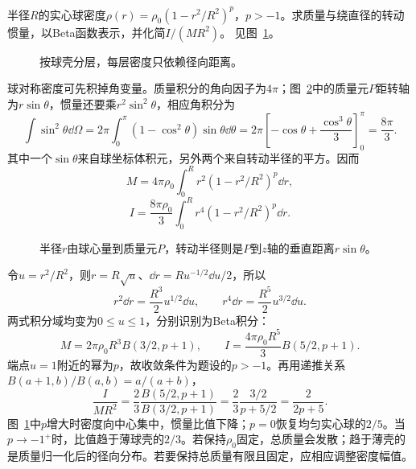 \begin{exercise}[从非均匀球体的转动惯量积分到Beta函数]\label{ex:c4-h16}
半径$R$的实心球密度$\rho(r)=\rho_0(1-r^2/R^2)^p$，$p>-1$。求质量与绕直径的转动惯量，以Beta函数表示，并化简$I/(MR^2)$。 见图~\ref{fig:c4-h16-q}。
\end{exercise}

\begin{figure}[H]\centering
{}
\caption{按球壳分层，每层密度只依赖径向距离。}\label{fig:c4-h16-q}
\end{figure}
\begin{solution}
球对称密度可先积掉角变量。质量积分的角向因子为$4\pi$；图~\ref{fig:c4-h16-s}中的质量元$P$距转轴为$r\sin\theta$，惯量还要乘$r^2\sin^2\theta$，相应角积分为
\[\int\sin^2\theta\dd\Omega
=2\pi\int_0^\pi(1-\cos^2\theta)\sin\theta\dd\theta
=2\pi\left[-\cos\theta+\frac{\cos^3\theta}{3}\right]_0^\pi
=\frac{8\pi}3.\]
其中一个$\sin\theta$来自球坐标体积元，另外两个来自转动半径的平方。因而
\[M=4\pi\rho_0\int_0^Rr^2(1-r^2/R^2)^p\dd r,\]
\[I=\frac{8\pi\rho_0}3\int_0^Rr^4(1-r^2/R^2)^p\dd r.\]
\begin{figure}[H]\centering
{}
\caption{半径$r$由球心量到质量元$P$，转动半径则是$P$到$z$轴的垂直距离$r\sin\theta$。}\label{fig:c4-h16-s}
\end{figure}

令$u=r^2/R^2$，则$r=R\sqrt u$、$\dd r=R u^{-1/2}\dd u/2$，所以
\[r^2\dd r=\frac{R^3}2u^{1/2}\dd u,\qquad
r^4\dd r=\frac{R^5}2u^{3/2}\dd u.\]
两式积分域均变为$0\le u\le1$，分别识别为Beta积分：
\[\boxed{M=2\pi\rho_0R^3B(3/2,p+1)},\qquad
I=\frac{4\pi\rho_0R^5}3B(5/2,p+1).\]
端点$u=1$附近的幂为$p$，故收敛条件为题设的$p>-1$。再用递推关系$B(a+1,b)/B(a,b)=a/(a+b)$，
\[\frac I{MR^2}=\frac23\frac{B(5/2,p+1)}{B(3/2,p+1)}
=\frac23\frac{3/2}{p+5/2}
=\boxed{\frac2{2p+5}}.\]
图~\ref{fig:c4-h16-q}中$p$增大时密度向中心集中，惯量比值下降；$p=0$恢复均匀实心球的$2/5$。当$p\to-1^+$时，比值趋于薄球壳的$2/3$。若保持$\rho_0$固定，总质量会发散；趋于薄壳的是质量归一化后的径向分布。若要保持总质量有限且固定，应相应调整密度幅值。


\end{solution}

